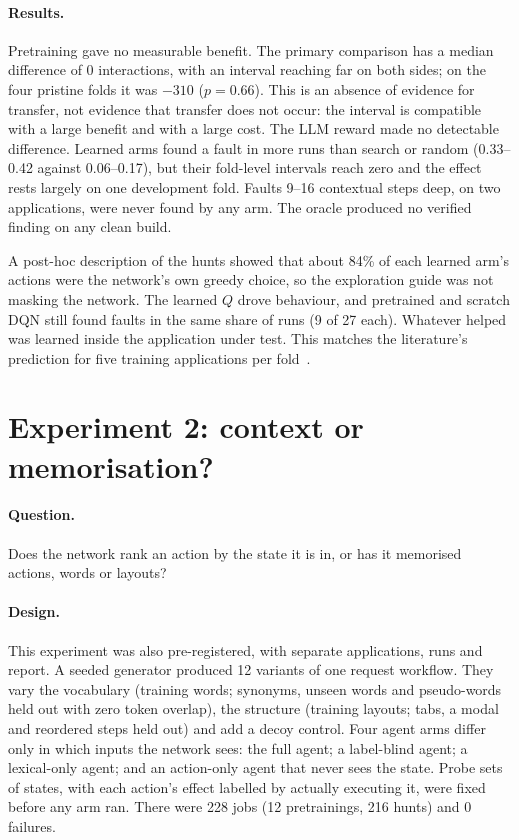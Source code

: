 \paragraph{Results.} Pretraining gave no measurable benefit. The primary comparison has a
median difference of 0 interactions, with an interval reaching far on both sides; on the four
pristine folds it was $-310$ ($p = 0.66$). This is an absence of evidence for transfer, not
evidence that transfer does not occur: the interval is compatible with a large benefit and
with a large cost. The LLM reward made no detectable difference.
Learned arms found a fault in more runs than search or random (0.33--0.42 against
0.06--0.17), but their fold-level intervals reach zero and the effect rests largely on one
development fold. Faults 9--16 contextual steps deep, on two applications, were never found
by any arm. The oracle produced no verified finding on any clean build.

A post-hoc description of the hunts showed that about 84\% of each learned arm's actions
were the network's own greedy choice, so the exploration guide was not masking the network.
The learned $Q$ drove behaviour, and pretrained and scratch DQN still found faults in the
same share of runs (9 of 27 each). Whatever helped was learned inside the application under
test. This matches the literature's prediction for five training applications per
fold~\cite{zhao2024dinodroid}.

\section{Experiment 2: context or memorisation?}
\label{sec:exp2}

\paragraph{Question.} Does the network rank an action by the state it is in, or has it
memorised actions, words or layouts?

\paragraph{Design.} This experiment was also pre-registered, with separate applications,
runs and report. A seeded generator produced 12 variants of one request workflow. They vary
the vocabulary (training words; synonyms, unseen words and pseudo-words held out with zero
token overlap), the structure (training layouts; tabs, a modal and reordered steps held out)
and add a decoy control. Four agent arms differ only in which inputs the network sees: the
full agent; a label-blind agent; a lexical-only agent; and an action-only agent that never
sees the state. Probe sets of states, with each action's effect labelled by actually
executing it, were fixed before any arm ran. There were 228 jobs (12 pretrainings, 216 hunts)
and 0 failures.

